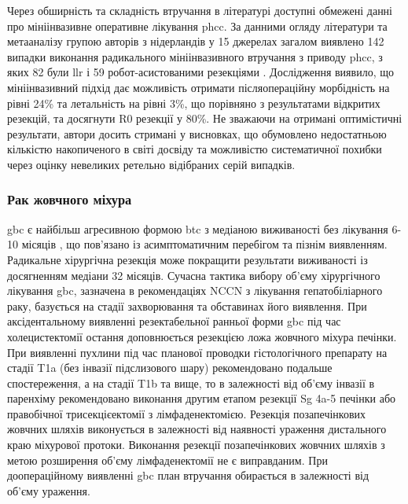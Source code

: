 \begin{refsection}
Через обширність та складність втручання в літературі доступні обмежені данні про мініінвазивне оперативне лікування \acrshort{phcc}. За данними огляду літератури та метааналізу групою авторів з нідерландів у 15 джерелах загалом виявлено 142 випадки виконання радикального мініінвазивного втручання з приводу \acrshort{phcc}, з яких 82 були \acrshort{llr} і 59 робот-асистованими резекціями \cite{Mizuno2019}. Дослідження виявило, що мініінвазивний підхід дає можливість отримати післяопераційну морбідність на рівні 24\% та летальність на рівні 3\%, що порівняно з результатами відкритих резекцій, та досягнути R0 резекції у 80\%. Не зважаючи на отримані оптимістичні результати, автори досить стримані у висновках, що обумовлено недостатньою кількістю накопиченого в світі досвіду та можливістю систематичної похибки через оцінку невеликих ретельно відібраних серій випадків. 

\subsubsection{Рак жовчного міхура}

\acrshort{gbc} є найбільш агресивною формою \acrshort{btc} з медіаною виживаності без лікування 6-10 місяців \cite{Lindner2018}, що пов'язано із асимптоматичним перебігом та пізнім виявленням. Радикальне хірургічна резекція може покращити результати виживаності із досягненням медіани 32 місяців. Сучасна тактика вибору об'єму хірургічного лікування \acrshort{gbc}, зазначена в рекомендаціях \acrshort{NCCN} з лікування гепатобіліарного раку, базується на стадії захворювання та обставинах його виявлення. При аксідентальному виявленні резектабельної ранньої форми \acrshort{gbc} під час холецистектомії остання доповнюється резекцією ложа жовчного міхура печінки. При виявленні пухлини під час планової проводки гістологічного препарату на стадії T1a (без інвазії підслизового шару) рекомендовано подальше спостереження, а на стадії T1b та вище, то в залежності від об'єму інвазії в паренхіму рекомендовано виконання другим етапом резекції Sg 4a-5 печінки або правобічної трисекцієектомії з лімфаденектомією. Резекція позапечінкових жовчних шляхів виконується в залежності від наявності ураження дистального краю міхурової протоки. Виконання резекції позапечінкових жовчних шляхів з метою розширення об'єму лімфаденектомії не є виправданим.  При доопераційному виявленні \acrshort{gbc} план втручання обирається в залежності від об'єму ураження.


\end{refsection}
